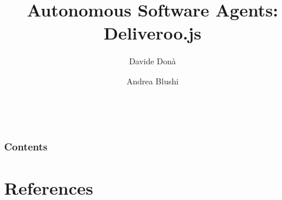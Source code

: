 \documentclass[10pt]{beamer}
\begin{document}
\title{Autonomous Software Agents: Deliveroo.js}
\author[University of Trento]{Davide Donà \and Andrea Blushi}


\date[]{\MonthName\ \number\year}

\frame{\titlepage}
\begin{frame}
\frametitle{Contents}
\tableofcontents
\end{frame}



\section*{References}  
\begin{frame}
\nocite{*}
 
\small{}
\end{frame}
\end{document}
